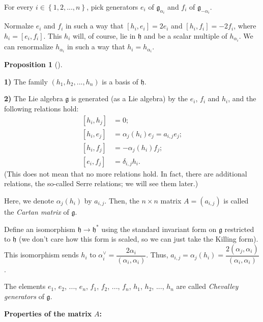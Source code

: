 \documentclass
[numbers=enddot,12pt,final,onecolumn,german,notitlepage]{scrartcl}%
\theoremstyle{definition}
\newtheorem{prop}[theo]{Proposition}
\newenvironment{proposition}[1][]
{\begin{prop}[#1]\begin{leftbar}}
{\end{leftbar}\end{prop}}
\begin{document}
For every $i\in\left\{  1,2,...,n\right\}  $, pick generators $e_{i}$ of
$\mathfrak{g}_{\alpha_{i}}$ and $f_{i}$ of $\mathfrak{g}_{-\alpha_{i}}$.

Normalze $e_{i}$ and $f_{i}$ in such a way that $\left[  h_{i},e_{i}\right]
=2e_{i}$ and $\left[  h_{i},f_{i}\right]  =-2f_{i}$, where $h_{i}=\left[
e_{i},f_{i}\right]  $. This $h_{i}$ will, of course, lie in $\mathfrak{h}$ and
be a scalar multiple of $h_{\alpha_{i}}$. We can renormalize $h_{\alpha_{i}}$
in such a way that $h_{i}=h_{\alpha_{i}}$.

\begin{proposition}
\label{prop.serre-gen.1}\textbf{1)} The family $\left(  h_{1},h_{2}%
,...,h_{n}\right)  $ is a basis of $\mathfrak{h}$.

\textbf{2)} The Lie algebra $\mathfrak{g}$ is generated (as a Lie algebra) by
the $e_{i}$, $f_{i}$ and $h_{i}$, and the following relations hold:%
\begin{align*}
\left[  h_{i},h_{j}\right]   &  =0;\\
\left[  h_{i},e_{j}\right]   &  =\alpha_{j}\left(  h_{i}\right)  e_{j}%
=a_{i,j}e_{j};\\
\left[  h_{i},f_{j}\right]   &  =-\alpha_{j}\left(  h_{i}\right)  f_{j};\\
\left[  e_{i},f_{j}\right]   &  =\delta_{i,j}h_{i}.
\end{align*}
(This does not mean that no more relations hold. In fact, there are additional
relations, the so-called Serre relations; we will see them later.)

Here, we denote $\alpha_{j}\left(  h_{i}\right)  $ by $a_{i,j}$. Then, the
$n\times n$ matrix $A=\left(  a_{i,j}\right)  $ is called the \textit{Cartan
matrix} of $\mathfrak{g}$.

Define an isomorphism $\mathfrak{h}\rightarrow\mathfrak{h}^{\ast}$ using the
standard invariant form on $\mathfrak{g}$ restricted to $\mathfrak{h}$ (we
don't care how this form is scaled, so we can just take the Killing form).
This isomorphism sends $h_{i}$ to $\alpha_{i}^{\vee}=\dfrac{2\alpha_{i}%
}{\left(  \alpha_{i},\alpha_{i}\right)  }$. Thus, $a_{i,j}=\alpha_{j}\left(
h_{i}\right)  =\dfrac{2\left(  \alpha_{j},\alpha_{i}\right)  }{\left(
\alpha_{i},\alpha_{i}\right)  }$.

The elements $e_{1}$, $e_{2}$, $...$, $e_{n}$, $f_{1}$, $f_{2}$, $...$,
$f_{n}$, $h_{1}$, $h_{2}$, $...$, $h_{n}$ are called \textit{Chevalley
generators} of $\mathfrak{g}$.

\textbf{Properties of the matrix }$A$\textbf{:}


\end{proposition}
\end{document}
